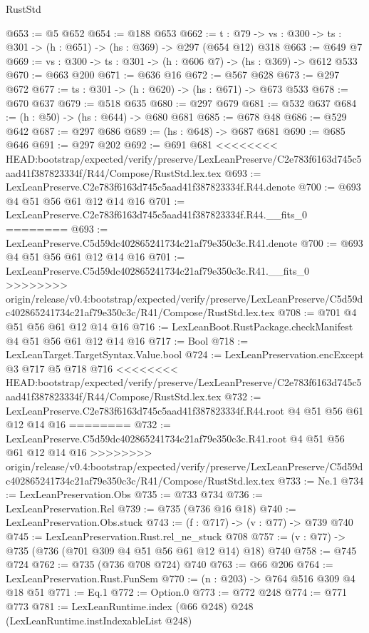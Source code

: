 \begin{lexlean}{RustStd}
\begin{coremodule}
{\begin{coremodule}
@653 := @5 @652
@654 := @188 @653
@662 := {t : @79} -> {vs : @300} -> {ts : @301} -> (h : @651) -> (hs : @369) -> @297 (@654 @12) @318
@663 := @649 @7
@669 := {vs : @300} -> {ts : @301} -> (h : @606 @7) -> (hs : @369) -> @612 @533
@670 := @663 @200
@671 := @636 @16
@672 := @567 @628
@673 := @297 @672
@677 := {ts : @301} -> (h : @620) -> (hs : @671) -> @673 @533
@678 := @670 @637
@679 := @518 @635
@680 := @297 @679
@681 := @532 @637
@684 := (h : @50) -> (hs : @644) -> @680 @681
@685 := @678 @48
@686 := @529 @642
@687 := @297 @686
@689 := (hs : @648) -> @687 @681
@690 := @685 @646
@691 := @297 @202
@692 := @691 @681
<<<<<<<< HEAD:bootstrap/expected/verify/preserve/LexLeanPreserve/C2e783f6163d745c5aad41f387823334f/R44/Compose/RustStd.lex.tex
@693 := LexLeanPreserve.C2e783f6163d745c5aad41f387823334f.R44.denote
@700 := @693 @4 @51 @56 @61 @12 @14 @16
@701 := LexLeanPreserve.C2e783f6163d745c5aad41f387823334f.R44.__fits_0
========
@693 := LexLeanPreserve.C5d59dc402865241734c21af79e350c3c.R41.denote
@700 := @693 @4 @51 @56 @61 @12 @14 @16
@701 := LexLeanPreserve.C5d59dc402865241734c21af79e350c3c.R41.__fits_0
>>>>>>>> origin/release/v0.4:bootstrap/expected/verify/preserve/LexLeanPreserve/C5d59dc402865241734c21af79e350c3c/R41/Compose/RustStd.lex.tex
@708 := @701 @4 @51 @56 @61 @12 @14 @16
@716 := LexLeanBoot.RustPackage.checkManifest @4 @51 @56 @61 @12 @14 @16
@717 := Bool
@718 := LexLeanTarget.TargetSyntax.Value.bool
@724 := LexLeanPreservation.encExcept @3 @717 @5 @718 @716
<<<<<<<< HEAD:bootstrap/expected/verify/preserve/LexLeanPreserve/C2e783f6163d745c5aad41f387823334f/R44/Compose/RustStd.lex.tex
@732 := LexLeanPreserve.C2e783f6163d745c5aad41f387823334f.R44.root @4 @51 @56 @61 @12 @14 @16
========
@732 := LexLeanPreserve.C5d59dc402865241734c21af79e350c3c.R41.root @4 @51 @56 @61 @12 @14 @16
>>>>>>>> origin/release/v0.4:bootstrap/expected/verify/preserve/LexLeanPreserve/C5d59dc402865241734c21af79e350c3c/R41/Compose/RustStd.lex.tex
@733 := Ne.{1}
@734 := LexLeanPreservation.Obs
@735 := @733 @734
@736 := LexLeanPreservation.Rel
@739 := @735 (@736 @16 @18)
@740 := LexLeanPreservation.Obs.stuck
@743 := (f : @717) -> (v : @77) -> @739 @740
@745 := LexLeanPreservation.Rust.rel_ne_stuck @708
@757 := (v : @77) -> @735 (@736 (@701 @309 @4 @51 @56 @61 @12 @14) @18) @740
@758 := @745 @724
@762 := @735 (@736 @708 @724) @740
@763 := @66 @206
@764 := LexLeanPreservation.Rust.FunSem
@770 := (n : @203) -> @764 @516 @309 @4 @18 @51
@771 := Eq.{1}
@772 := Option.{0}
@773 := @772 @248
@774 := @771 @773
@781 := LexLeanRuntime.index (@66 @248) @248 (LexLeanRuntime.instIndexableList @248)

\end{coremodule}}
\end{coremodule}
\end{lexlean}
